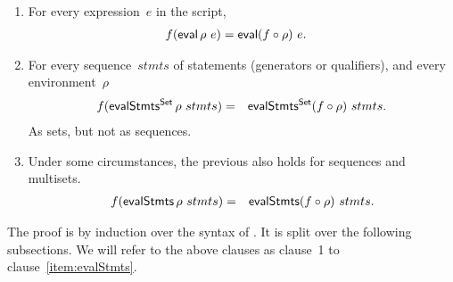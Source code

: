 \begin{prop}
\begin{enumerate}




\item\label{item:eval} For every expression~$e$ in the script,
\begin{eqnarray*}
f(\mathop{\sf eval} \rho ~ e) & = \mathop{\sf eval} (f \circ \rho) ~e .
\end{eqnarray*}

\item\label{item:evalStmtsSet}
For every sequence~$stmts$ of statements (generators or qualifiers), and every
environment~$\rho$\,  
\begin{eqnarray*}
f (\mathop{\sf evalStmts^{Set}} \rho ~ stmts) & = & \mathop{\sf evalStmts^{Set}} (f\circ\rho)~stmts.
\end{eqnarray*}
%
\framebox{***} As sets, but not as sequences. 

\item \label{item:evalStmts}
Under some circumstances, the previous also holds for sequences and
multisets. 
\begin{eqnarray*}
f (\mathop{\sf evalStmts} \rho ~ stmts) & = & \mathop{\sf evalStmts} (f\circ\rho)~stmts.
\end{eqnarray*}

\end{enumerate}
\end{prop}


The proof is by induction over the syntax of \CSPm.  It is split over the
following subsections.  We will refer to the above clauses as clause~1 to
clause~\ref{item:evalStmts}. 

